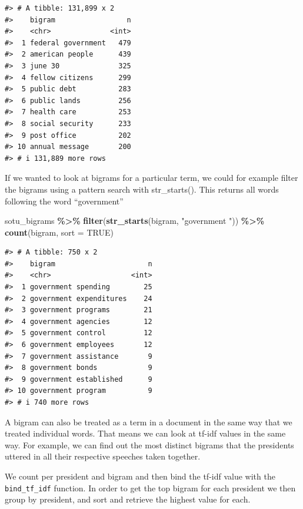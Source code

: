 \documentclass[
]{book}
\newenvironment{Shaded}{\begin{snugshade}}{\end{snugshade}}
\newcommand{\AttributeTok}[1]{\textcolor[rgb]{0.13,0.29,0.53}{#1}}
\newcommand{\ConstantTok}[1]{\textcolor[rgb]{0.56,0.35,0.01}{#1}}
\newcommand{\FunctionTok}[1]{\textcolor[rgb]{0.13,0.29,0.53}{\textbf{#1}}}
\newcommand{\NormalTok}[1]{#1}
\newcommand{\SpecialCharTok}[1]{\textcolor[rgb]{0.81,0.36,0.00}{\textbf{#1}}}
\newcommand{\StringTok}[1]{\textcolor[rgb]{0.31,0.60,0.02}{#1}}
\begin{document}
\begin{verbatim}
#> # A tibble: 131,899 x 2
#>    bigram                 n
#>    <chr>              <int>
#>  1 federal government   479
#>  2 american people      439
#>  3 june 30              325
#>  4 fellow citizens      299
#>  5 public debt          283
#>  6 public lands         256
#>  7 health care          253
#>  8 social security      233
#>  9 post office          202
#> 10 annual message       200
#> # i 131,889 more rows
\end{verbatim}

If we wanted to look at bigrams for a particular term, we could for example filter the bigrams using a pattern search with str\_starts(). This returns all words following the word ``government''

\begin{Shaded}
\begin{Highlighting}[]
\NormalTok{sotu\_bigrams }\SpecialCharTok{\%\textgreater{}\%} 
  \FunctionTok{filter}\NormalTok{(}\FunctionTok{str\_starts}\NormalTok{(bigram, }\StringTok{"government "}\NormalTok{)) }\SpecialCharTok{\%\textgreater{}\%} 
  \FunctionTok{count}\NormalTok{(bigram, }\AttributeTok{sort =} \ConstantTok{TRUE}\NormalTok{)}
\end{Highlighting}
\end{Shaded}

\begin{verbatim}
#> # A tibble: 750 x 2
#>    bigram                      n
#>    <chr>                   <int>
#>  1 government spending        25
#>  2 government expenditures    24
#>  3 government programs        21
#>  4 government agencies        12
#>  5 government control         12
#>  6 government employees       12
#>  7 government assistance       9
#>  8 government bonds            9
#>  9 government established      9
#> 10 government program          9
#> # i 740 more rows
\end{verbatim}

A bigram can also be treated as a term in a document in the same way that we treated individual words. That means we can look at tf-idf values in the same way. For example, we can find out the most distinct bigrams that the presidents uttered in all their respective speeches taken together.

We count per president and bigram and then bind the tf-idf value with the \texttt{bind\_tf\_idf} function. In order to get the top bigram for each president we then group by president, and sort and retrieve the highest value for each.
\end{document}
